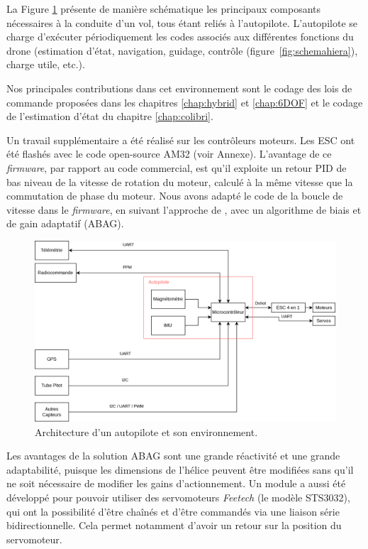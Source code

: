 La Figure \ref{fig:schemaComposent} présente de manière schématique les principaux composants nécessaires à la conduite d'un vol, tous étant reliés à l'autopilote. L'autopilote se charge d'exécuter périodiquement les codes associés aux différentes fonctions du drone (estimation d'état, navigation, guidage, contrôle (figure~\ref{fig:schemahiera}), charge utile, etc.).


Nos principales contributions dans cet environnement sont le codage des lois de commande proposées dans les chapitres \ref{chap:hybrid} et \ref{chap:6DOF} et le codage de l'estimation d'état du chapitre \ref{chap:colibri}. 

Un travail supplémentaire a été réalisé sur les contrôleurs moteurs. Les ESC ont été flashés avec le code open-source AM32 (voir Annexe). L'avantage de ce \textit{firmware}, par rapport au code commercial, est qu'il exploite un retour PID de bas niveau de la vitesse de rotation du moteur, calculé à la même vitesse que la commutation de phase du moteur. Nous avons adapté le code de la boucle de vitesse dans le \textit{firmware}, en suivant l'approche de \cite{franchi2017}, avec un algorithme de biais et de gain adaptatif (ABAG). 

\begin{figure}[ht!]
    \centerline{
    \includegraphics[trim=0cm 0cm 0cm 0cm,clip,width=0.9\columnwidth]{figures/arch_materiel.png}}
    \caption{Architecture d'un autopilote et son environnement.}
    \label{fig:schemaComposent}
\end{figure}

Les avantages de la solution ABAG sont une grande réactivité et une grande adaptabilité, puisque les dimensions de l'hélice peuvent être modifiées sans qu'il ne soit nécessaire de modifier les gains d'actionnement.
Un module a aussi été développé pour pouvoir utiliser des servomoteurs \textit{Feetech} (le modèle STS3032), qui ont la possibilité d'être chaînés et d'être commandés via une liaison série bidirectionnelle. Cela permet notamment d'avoir un retour sur la position du servomoteur.

